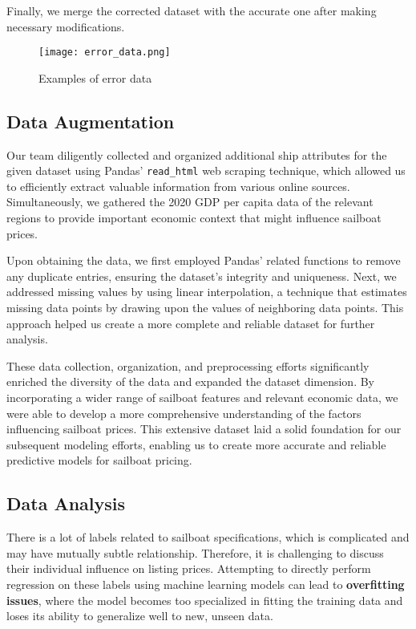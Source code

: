 \documentclass[12pt]{article}  %
\begin{document}
Finally, we merge the corrected dataset with the accurate one after making necessary modifications.
\begin{figure}[htbp]
    \centering
    \texttt{[image: error\_data.png]}
    \caption{Examples of error data}\label{fig:error_data}
\end{figure}

\subsection{Data Augmentation}

Our team diligently collected and organized additional ship attributes for the given dataset using Pandas' \texttt{read\_html} web scraping technique,
which allowed us to efficiently extract valuable information from various online sources. 
Simultaneously, we gathered the 2020 GDP per capita  data of the relevant regions to provide important economic context that might influence sailboat prices.

Upon obtaining the data, we first employed Pandas' related functions to remove any duplicate entries, 
ensuring the dataset's integrity and uniqueness. 
Next, we addressed missing values by using linear interpolation, 
a technique that estimates missing data points by drawing upon the values of neighboring data points. 
This approach helped us create a more complete and reliable dataset for further analysis.

These data collection, organization, and preprocessing efforts significantly enriched the diversity of the data and expanded the dataset dimension.
By incorporating a wider range of sailboat features and relevant economic data, we were able to develop a more comprehensive understanding of the factors influencing sailboat prices. 
This extensive dataset laid a solid foundation for our subsequent modeling efforts, enabling us to create more accurate and reliable predictive models for sailboat pricing.





\subsection{Data Analysis}
There is a lot of labels related to sailboat specifications, which is complicated and may have mutually subtle relationship.
Therefore, it is challenging to discuss their individual influence on listing prices.
Attempting to directly perform regression on these labels using machine learning models can lead to \textbf{overfitting issues}, where the model becomes too specialized in fitting the training data and loses its ability to generalize well to new, unseen data.
\end{document}
